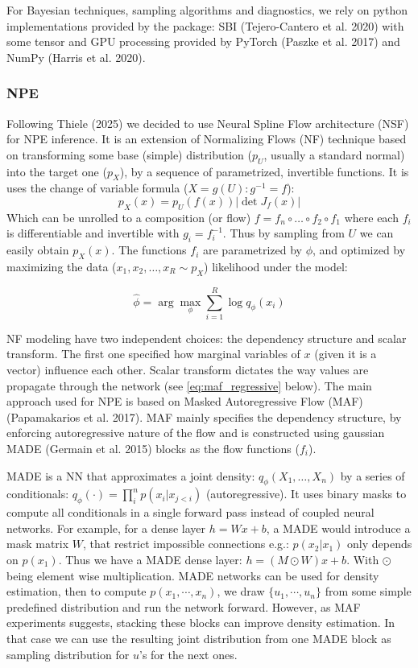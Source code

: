 \documentclass[12pt]{article}
\begin{document}
For Bayesian techniques, sampling algorithms and diagnostics, we rely on python implementations provided by the package: SBI (Tejero-Cantero  et al. 2020) with some tensor and GPU processing provided by PyTorch (Paszke et al. 2017) and NumPy (Harris et al. 2020).

\subsubsection*{NPE}
Following Thiele (2025) we decided to use Neural Spline Flow architecture (NSF) for NPE inference. It is an extension of Normalizing Flows (NF) technique based on transforming some base (simple) distribution ($p_U$, usually a standard normal) into the target one ($p_X$), by a sequence of parametrized, invertible functions. It is uses the change of variable formula ($X = g(U) : g^{-1} = f$):
\begin{equation} \label{eq:nfs}
    p_X(x) = p_U(f(x)) \big| \det J_f (x) \big|
\end{equation}
Which can be unrolled to a composition (or flow) $f = f_n \circ \dots \circ f_2 \circ f_1$ where each $f_i $ is differentiable and invertible with $g_i = f^{-1}_i$. Thus by sampling from $U$ we can easily obtain $p_X(x)$. The functions $f_i$ are parametrized by $\phi$, and optimized by maximizing the data ($x_1, x_2, \dots, x_R \sim p_X$) likelihood under the model:

\begin{equation} \label{eq:amortized_NPE}
    \hat{\phi} = \arg \max_{\phi} \sum_{i = 1}^R \log q_\phi(x_i)
\end{equation}

NF modeling have two independent choices: the dependency structure and scalar transform. The first one specified how marginal variables of $x$ (given it is a vector) influence each other. Scalar transform dictates the way values are propagate through the network (see \eqref{eq:maf_regressive} below). The main approach used for NPE is based on Masked Autoregressive Flow (MAF) (Papamakarios et al. 2017). MAF mainly specifies the dependency structure, by enforcing autoregressive nature of the flow and is constructed using gaussian MADE (Germain et al. 2015) blocks as the flow functions ($f_i$). 

MADE is a NN that approximates a joint density: $q_\phi(X_1, \dots , X_n) $ by a series of conditionals: $q_\phi(\cdot) = \prod_i^n p(x_i | x_{j < i})$ (autoregressive). It uses binary masks to compute all conditionals in a single forward pass instead of coupled neural networks. For example, for a dense layer $h = Wx + b$, a MADE would introduce a mask matrix $W$, that restrict impossible connections e.g.: $p(x_2 | x_1)$ only depends on $p(x_1)$. Thus we have a MADE dense layer: $h = (M \odot W)x + b$. With $\odot$ being element wise multiplication. MADE networks can be used for density estimation, then to compute $p(x_1, \cdots, x_n)$, we draw $\{ u_1, \cdots, u_n \}$ from some simple predefined distribution and run the network forward. However, as MAF experiments suggests, stacking these blocks can improve density estimation. In that case we can use the resulting joint distribution from one MADE block as sampling distribution for $u$'s for the next ones. 
\end{document}
